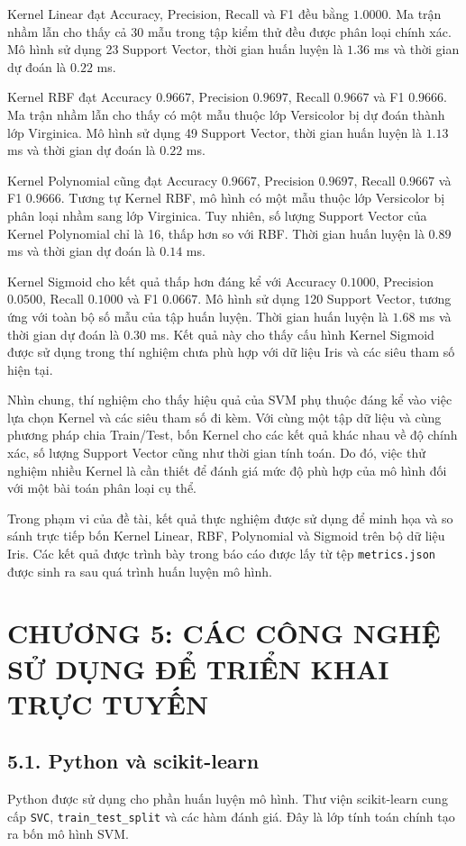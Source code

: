\documentclass{article}
\begin{document}
	Kernel Linear đạt Accuracy, Precision, Recall và F1 đều bằng $1.0000$. Ma trận nhầm lẫn cho thấy cả 30 mẫu trong tập kiểm thử đều được phân loại chính xác. Mô hình sử dụng 23 Support Vector, thời gian huấn luyện là $1.36$ ms và thời gian dự đoán là $0.22$ ms.
	
	Kernel RBF đạt Accuracy $0.9667$, Precision $0.9697$, Recall $0.9667$ và F1 $0.9666$. Ma trận nhầm lẫn cho thấy có một mẫu thuộc lớp Versicolor bị dự đoán thành lớp Virginica. Mô hình sử dụng 49 Support Vector, thời gian huấn luyện là $1.13$ ms và thời gian dự đoán là $0.22$ ms.
	
	Kernel Polynomial cũng đạt Accuracy $0.9667$, Precision $0.9697$, Recall $0.9667$ và F1 $0.9666$. Tương tự Kernel RBF, mô hình có một mẫu thuộc lớp Versicolor bị phân loại nhầm sang lớp Virginica. Tuy nhiên, số lượng Support Vector của Kernel Polynomial chỉ là 16, thấp hơn so với RBF. Thời gian huấn luyện là $0.89$ ms và thời gian dự đoán là $0.14$ ms.
	
	Kernel Sigmoid cho kết quả thấp hơn đáng kể với Accuracy $0.1000$, Precision $0.0500$, Recall $0.1000$ và F1 $0.0667$. Mô hình sử dụng 120 Support Vector, tương ứng với toàn bộ số mẫu của tập huấn luyện. Thời gian huấn luyện là $1.68$ ms và thời gian dự đoán là $0.30$ ms. Kết quả này cho thấy cấu hình Kernel Sigmoid được sử dụng trong thí nghiệm chưa phù hợp với dữ liệu Iris và các siêu tham số hiện tại.
	
	Nhìn chung, thí nghiệm cho thấy hiệu quả của SVM phụ thuộc đáng kể vào việc lựa chọn Kernel và các siêu tham số đi kèm. Với cùng một tập dữ liệu và cùng phương pháp chia Train/Test, bốn Kernel cho các kết quả khác nhau về độ chính xác, số lượng Support Vector cũng như thời gian tính toán. Do đó, việc thử nghiệm nhiều Kernel là cần thiết để đánh giá mức độ phù hợp của mô hình đối với một bài toán phân loại cụ thể.
	
	Trong phạm vi của đề tài, kết quả thực nghiệm được sử dụng để minh họa và so sánh trực tiếp bốn Kernel Linear, RBF, Polynomial và Sigmoid trên bộ dữ liệu Iris. Các kết quả được trình bày trong báo cáo được lấy từ tệp \texttt{metrics.json} được sinh ra sau quá trình huấn luyện mô hình.
	
	\newpage
	\section{\centering CHƯƠNG 5: CÁC CÔNG NGHỆ SỬ DỤNG ĐỂ TRIỂN KHAI TRỰC TUYẾN}
	\subsection{5.1. Python và scikit-learn}
	\hspace{0.5cm}
	Python được sử dụng cho phần huấn luyện mô hình. Thư viện scikit-learn cung cấp \texttt{SVC}, \texttt{train\_test\_split} và các hàm đánh giá. Đây là lớp tính toán chính tạo ra bốn mô hình SVM.
	
\end{document}

